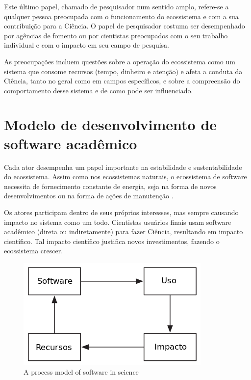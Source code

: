 Este último papel, chamado de pesquisador num sentido amplo, refere-se a
qualquer pessoa preocupada com o funcionamento do ecossistema e com a sua
contribuição para a Ciência. O papel de pesquisador costuma ser desempenhado 
por agências de fomento ou por cientistas preocupados com o seu trabalho 
individual e com o impacto em seu campo de pesquisa.

As preocupações incluem questões sobre a operação do ecossistema
como um sistema que consome recursos (tempo, dinheiro e atenção) e afeta a
conduta da Ciência, tanto no geral como em campos específicos, 
e sobre a compreensão do comportamento desse sistema e de 
como pode ser influenciado.

\section{Modelo de desenvolvimento de software acadêmico}


Cada ator desempenha um papel importante na estabilidade e sustentabilidade do
ecossistema. Assim como nos ecossistemas naturais, o ecossistema de software
necessita de fornecimento constante de energia, seja na forma de
novos desenvolvimentos ou na forma de ações de manutenção \cite{dhungana2010software}.

Os atores participam dentro de seus próprios interesses, mas sempre causando
impacto no sistema como um todo. Cientistas usuários finais usam software
acadêmico (direta ou indiretamente) para fazer Ciência, resultando em impacto
científico. Tal impacto científico justifica novos investimentos, fazendo o
ecossistema crescer.


\begin{figure}[h]
  \center
  \includegraphics[scale=0.5]{imagens/process-model-scientific-software-dia.png}
  \caption{A process model of software in science \cite{howison2015understanding}}
  \label{process-model-scientific-software}
\end{figure}

